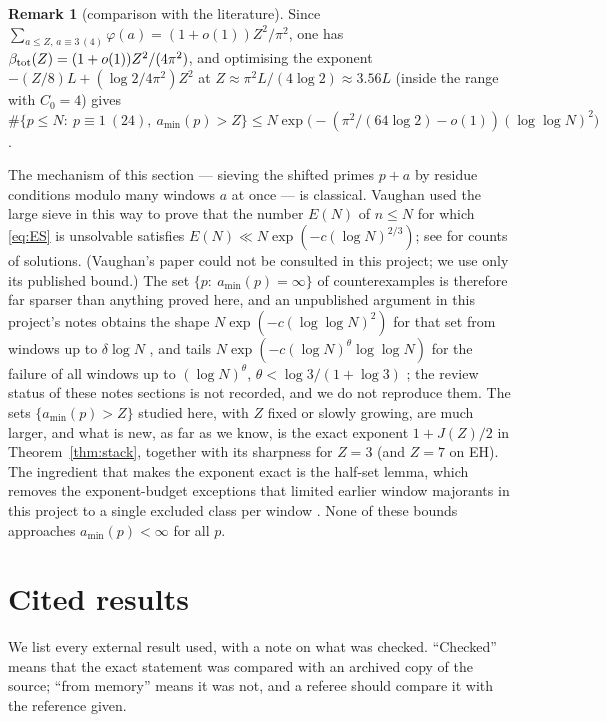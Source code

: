 \documentclass[11pt,reqno]{amsart}
\theoremstyle{definition}
\newtheorem{remark}[theorem]{Remark}
\newcommand{\amin}{a_{\min}}
\begin{document}
\begin{remark}[comparison with the literature]\label{rem:compare}
Since $\sum_{a\le Z,\,a\equiv3\,(4)}\varphi(a)=(1+o(1))Z^2/\pi^2$, one has
$\beta_{\rm tot}(Z)=(1+o(1))Z^2/(4\pi^2)$, and optimising the exponent
$-(Z/8)L+(\log2/4\pi^2)Z^2$ at $Z\approx\pi^2L/(4\log2)\approx3.56L$ (inside the
range with $C_0=4$) gives
$\#\{p\le N:\ p\equiv1\ (24),\ \amin(p)>Z\}\le N\exp\bigl(-(\pi^2/(64\log2)-o(1))(\log\log N)^2\bigr)$.

The mechanism of this section --- sieving the shifted primes $p+a$ by
residue conditions modulo many windows $a$ at once --- is classical.
Vaughan \cite{Vaughan} used the large sieve in this way to prove that the
number $E(N)$ of $n\le N$ for which \eqref{eq:ES} is unsolvable satisfies
$E(N)\ll N\exp(-c(\log N)^{2/3})$; see \cite{ET} for counts of
solutions.  (Vaughan's paper could not be consulted in this project; we
use only its published bound.)  The set $\{p:\ \amin(p)=\infty\}$ of
counterexamples is therefore far sparser than anything proved here, and
an unpublished argument in this project's notes obtains the shape
$N\exp(-c(\log\log N)^2)$ for that set from windows up to $\delta\log N$
\cite[Thm.~12.2]{Notes}, and tails $N\exp(-c(\log N)^\theta\log\log N)$
for the failure of all windows up to $(\log N)^\theta$,
$\theta<\log3/(1+\log3)$ \cite[Thms.~14.4, 14.9]{Notes}; the review
status of these notes sections is not recorded, and we do not reproduce
them.  The sets $\{\amin(p)>Z\}$ studied here, with $Z$ fixed or slowly
growing, are much larger, and what is new, as far as we know, is the
exact exponent $1+J(Z)/2$ in Theorem~\ref{thm:stack}, together with its
sharpness for $Z=3$ (and $Z=7$ on EH).  The ingredient that makes the
exponent exact is the half-set lemma, which removes the exponent-budget
exceptions that limited earlier window majorants in this project to a
single excluded class per window \cite[\S71]{Notes}.  None of these bounds approaches $\amin(p)<\infty$ for
all $p$.
\end{remark}

\section{Cited results}\label{sec:cited}

We list every external result used, with a note on what was checked.
``Checked'' means that the exact statement was compared with an archived
copy of the source; ``from memory'' means it was not, and a referee should
compare it with the reference given.
\end{document}
